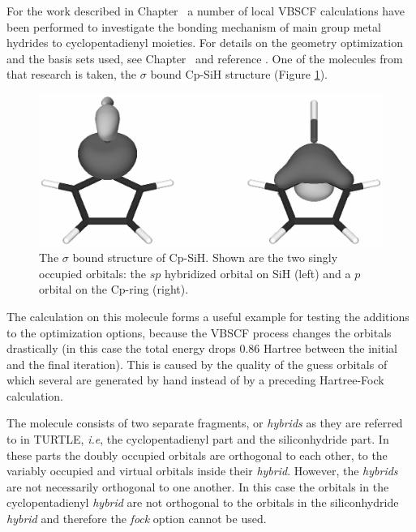 For the work described in Chapter \chcyclopentadienyl\, a number of local VBSCF calculations have been performed to investigate the bonding mechanism of main group metal hydrides to cyclopentadienyl moieties. For details on the geometry optimization and the basis sets used, see Chapter \chcyclopentadienyl\ and reference \cite{budzelaar}. One of the molecules from that research is taken, the $\sigma$ bound \mbox{Cp-SiH} structure (Figure \ref{fig.cpsih}).
\begin{figure}[htdp]
\center
\includegraphics[scale=0.6]{orbopt/figures/sigma_sih.eps}
\caption{The $\sigma$ bound structure of Cp-SiH. Shown are the two singly occupied orbitals: the $sp$ hybridized orbital on SiH (left) and a $p$ orbital on the Cp-ring (right).}
\label{fig.cpsih}
\end{figure}
The calculation on this molecule forms a useful example for testing the additions to the optimization options, because the VBSCF process changes the orbitals drastically (in this case the total energy drops 0.86 Hartree between the initial and the final iteration). This is caused by the quality of the guess orbitals of which several are generated by hand instead of by a preceding Hartree-Fock calculation.

The molecule consists of two separate fragments, or \textit{hybrids} as they are referred to in TURTLE, \textit{i.e}, the cyclopentadienyl part and the siliconhydride part. In these parts the doubly occupied orbitals are orthogonal to each other, to the variably occupied and virtual orbitals inside their \textit{hybrid}. However, the \textit{hybrids} are not necessarily orthogonal to one another. In this case the orbitals in the cyclopentadienyl \textit{hybrid} are not orthogonal to the orbitals in the siliconhydride \textit{hybrid} and therefore the \textit{fock} option cannot be used.

